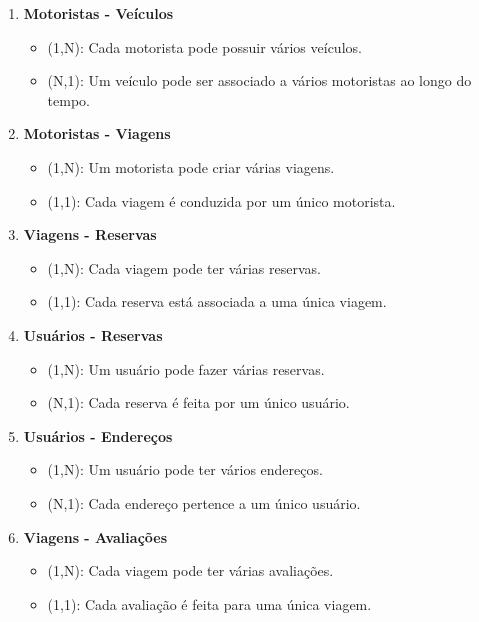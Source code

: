 \begin{enumerate}
	\item \textbf{Motoristas - Veículos}
	\begin{itemize}
		\item (1,N): Cada motorista pode possuir vários veículos.
		\item (N,1): Um veículo pode ser associado a vários motoristas ao longo do tempo.
	\end{itemize}
	
	\item \textbf{Motoristas - Viagens}
	\begin{itemize}
		\item (1,N): Um motorista pode criar várias viagens.
		\item (1,1): Cada viagem é conduzida por um único motorista.
	\end{itemize}
	
	\item \textbf{Viagens - Reservas}
	\begin{itemize}
		\item (1,N): Cada viagem pode ter várias reservas.
		\item (1,1): Cada reserva está associada a uma única viagem.
	\end{itemize}
	
	\item \textbf{Usuários - Reservas}
	\begin{itemize}
		\item (1,N): Um usuário pode fazer várias reservas.
		\item (N,1): Cada reserva é feita por um único usuário.
	\end{itemize}
	
	\item \textbf{Usuários - Endereços}
	\begin{itemize}
		\item (1,N): Um usuário pode ter vários endereços.
		\item (N,1): Cada endereço pertence a um único usuário.
	\end{itemize}
	
	\item \textbf{Viagens - Avaliações}
	\begin{itemize}
		\item (1,N): Cada viagem pode ter várias avaliações.
		\item (1,1): Cada avaliação é feita para uma única viagem.
	\end{itemize}
	

\end{enumerate}
